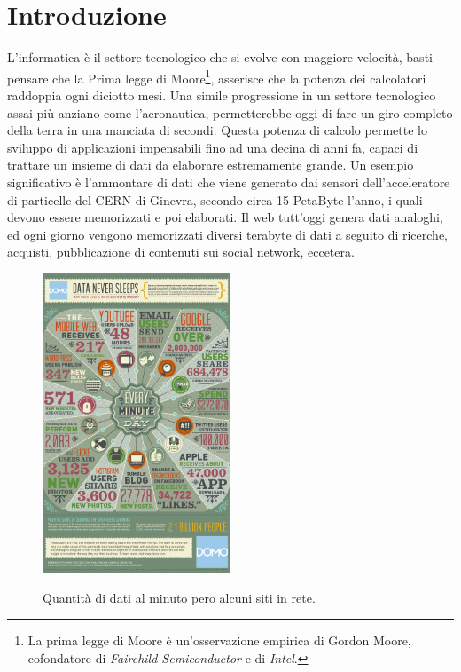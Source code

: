 
\chapter{Introduzione}
L'informatica è il settore tecnologico che si evolve con maggiore velocità, basti pensare che la Prima legge di Moore\footnote{La prima legge di Moore è un'osservazione empirica di Gordon Moore, cofondatore di \emph{Fairchild Semiconductor} e di \emph{Intel}.}, asserisce che la potenza dei calcolatori raddoppia ogni diciotto mesi. Una simile progressione in un settore tecnologico assai più anziano come l'aeronautica, permetterebbe oggi di fare un giro completo della terra in una manciata di secondi. Questa potenza di calcolo permette lo sviluppo di applicazioni impensabili fino ad una decina di anni fa, capaci di trattare un insieme di dati da elaborare estremamente grande. Un esempio significativo è l'ammontare di dati che viene generato dai sensori dell'acceleratore di particelle del CERN di Ginevra, secondo \cite{pres_cern} circa 15 PetaByte l'anno, i quali devono essere memorizzati e poi elaborati. Il web tutt'oggi genera dati analoghi, ed ogni giorno vengono memorizzati diversi terabyte di dati a seguito di ricerche, acquisti, pubblicazione di contenuti sui social network, eccetera. 
\begin{figure}
	\centering
	\includegraphics[width=0.50\textwidth]{Data-in-One-Minute.jpg}
	\label{data_per_minute}
	\caption{Quantità di dati al minuto pero alcuni siti in rete.}
\end{figure}
